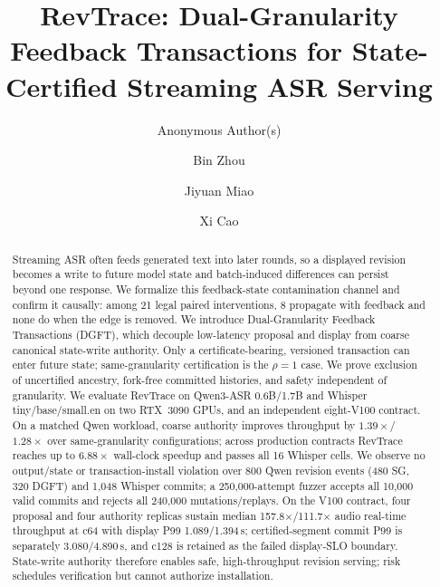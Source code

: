 \documentclass[5p]{elsarticle}
\theoremstyle{remark}
\newcommand{\granratio}{\rho}
\begin{document}
\begin{frontmatter}

\title{RevTrace: Dual-Granularity Feedback Transactions for
State-Certified Streaming ASR Serving}

\ifdefined\blindreview
  \author{Anonymous Author(s)}
\else
  \author[1]{Bin Zhou}
  \author[1]{Jiyuan Miao}
  \author[1]{Xi Cao}
\fi

\begin{abstract}
Streaming ASR often feeds generated text into later rounds, so a displayed
revision becomes a write to future model state and batch-induced differences
can persist beyond one response. We formalize this
feedback-state contamination channel and confirm it causally: among 21 legal
paired interventions, 8 propagate with feedback and none do when the edge is
removed. We introduce Dual-Granularity Feedback Transactions (DGFT), which
decouple low-latency proposal and display from coarse canonical state-write
authority. Only a certificate-bearing, versioned transaction can enter future
state; same-granularity certification is the $\granratio=1$ case. We prove
exclusion of uncertified ancestry, fork-free committed histories, and safety
independent of granularity. We evaluate RevTrace
on Qwen3-ASR 0.6B/1.7B and Whisper tiny/base/small.en on two RTX~3090 GPUs,
and an independent eight-V100 contract. On a matched Qwen workload,
coarse authority improves throughput by $1.39\times$/$1.28\times$ over
same-granularity configurations; across production contracts RevTrace reaches
up to $6.88\times$ wall-clock speedup and passes all 16 Whisper cells. We
observe no output/state or transaction-install violation over 800 Qwen
revision events (480 SG, 320 DGFT) and 1{,}048 Whisper commits; a
250{,}000-attempt fuzzer accepts
all 10{,}000 valid commits and rejects all 240{,}000 mutations/replays. On the
V100 contract, four proposal and four authority replicas sustain
median 157.8$\times$/111.7$\times$ audio real-time throughput at c64 with
display P99 1.089/1.394\,s; certified-segment commit P99 is separately
3.080/4.890\,s, and c128 is retained as the failed display-SLO boundary.
State-write authority therefore enables safe, high-throughput revision
serving; risk schedules verification but cannot authorize installation.
\end{abstract}


\end{frontmatter}
\end{document}
